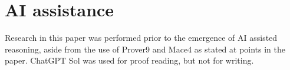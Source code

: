 \documentclass[eqnor,reqno]{amsart}
\theoremstyle{plain}
\theoremstyle{definition}
\newtheorem{remark}[thm]{Remark}
\begin{document}
\section*{AI assistance}
Research in this paper was performed prior to the emergence of AI assisted reasoning, aside from the use of Prover9 and Mace4 as stated at points in the paper.  
ChatGPT Sol was used for proof reading, but not for writing.




\end{document}
